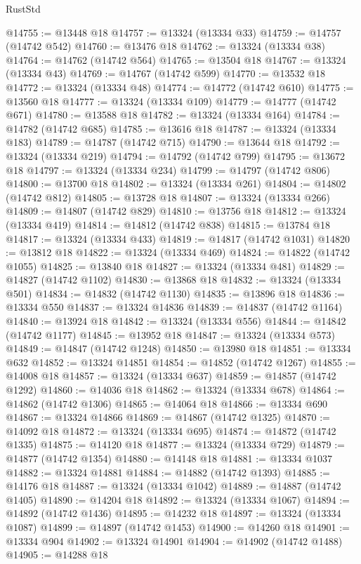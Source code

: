 \begin{lexlean}{RustStd}
\begin{coremodule}
@14755 := @13448 @18
@14757 := @13324 (@13334 @33)
@14759 := @14757 (@14742 @542)
@14760 := @13476 @18
@14762 := @13324 (@13334 @38)
@14764 := @14762 (@14742 @564)
@14765 := @13504 @18
@14767 := @13324 (@13334 @43)
@14769 := @14767 (@14742 @599)
@14770 := @13532 @18
@14772 := @13324 (@13334 @48)
@14774 := @14772 (@14742 @610)
@14775 := @13560 @18
@14777 := @13324 (@13334 @109)
@14779 := @14777 (@14742 @671)
@14780 := @13588 @18
@14782 := @13324 (@13334 @164)
@14784 := @14782 (@14742 @685)
@14785 := @13616 @18
@14787 := @13324 (@13334 @183)
@14789 := @14787 (@14742 @715)
@14790 := @13644 @18
@14792 := @13324 (@13334 @219)
@14794 := @14792 (@14742 @799)
@14795 := @13672 @18
@14797 := @13324 (@13334 @234)
@14799 := @14797 (@14742 @806)
@14800 := @13700 @18
@14802 := @13324 (@13334 @261)
@14804 := @14802 (@14742 @812)
@14805 := @13728 @18
@14807 := @13324 (@13334 @266)
@14809 := @14807 (@14742 @829)
@14810 := @13756 @18
@14812 := @13324 (@13334 @419)
@14814 := @14812 (@14742 @838)
@14815 := @13784 @18
@14817 := @13324 (@13334 @433)
@14819 := @14817 (@14742 @1031)
@14820 := @13812 @18
@14822 := @13324 (@13334 @469)
@14824 := @14822 (@14742 @1055)
@14825 := @13840 @18
@14827 := @13324 (@13334 @481)
@14829 := @14827 (@14742 @1102)
@14830 := @13868 @18
@14832 := @13324 (@13334 @501)
@14834 := @14832 (@14742 @1130)
@14835 := @13896 @18
@14836 := @13334 @550
@14837 := @13324 @14836
@14839 := @14837 (@14742 @1164)
@14840 := @13924 @18
@14842 := @13324 (@13334 @556)
@14844 := @14842 (@14742 @1177)
@14845 := @13952 @18
@14847 := @13324 (@13334 @573)
@14849 := @14847 (@14742 @1248)
@14850 := @13980 @18
@14851 := @13334 @632
@14852 := @13324 @14851
@14854 := @14852 (@14742 @1267)
@14855 := @14008 @18
@14857 := @13324 (@13334 @637)
@14859 := @14857 (@14742 @1292)
@14860 := @14036 @18
@14862 := @13324 (@13334 @678)
@14864 := @14862 (@14742 @1306)
@14865 := @14064 @18
@14866 := @13334 @690
@14867 := @13324 @14866
@14869 := @14867 (@14742 @1325)
@14870 := @14092 @18
@14872 := @13324 (@13334 @695)
@14874 := @14872 (@14742 @1335)
@14875 := @14120 @18
@14877 := @13324 (@13334 @729)
@14879 := @14877 (@14742 @1354)
@14880 := @14148 @18
@14881 := @13334 @1037
@14882 := @13324 @14881
@14884 := @14882 (@14742 @1393)
@14885 := @14176 @18
@14887 := @13324 (@13334 @1042)
@14889 := @14887 (@14742 @1405)
@14890 := @14204 @18
@14892 := @13324 (@13334 @1067)
@14894 := @14892 (@14742 @1436)
@14895 := @14232 @18
@14897 := @13324 (@13334 @1087)
@14899 := @14897 (@14742 @1453)
@14900 := @14260 @18
@14901 := @13334 @904
@14902 := @13324 @14901
@14904 := @14902 (@14742 @1488)
@14905 := @14288 @18

\end{coremodule}
\end{lexlean}
